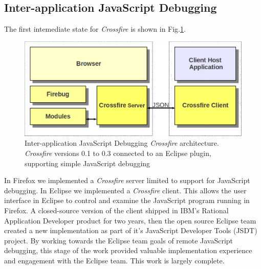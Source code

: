 \subsection{Inter-application JavaScript Debugging}
The first intemediate state for \textit{Crossfire} is shown in Fig.\ref{fig:fireclipse}.
\begin{figure}[htp]
  \includegraphics  [width = 86 mm] {figures/fireclipse.png}
  \caption{Inter-application JavaScript Debugging \textit{Crossfire} architecture.
\textit{Crossfire} versions 0.1 to 0.3 connected to an Eclipse plugin, supporting simple JavaScript debugging}
 \label{fig:fireclipse}
\end{figure}
In Firefox we implemented a \textit{Crossfire} server limited to support for JavaScript debugging.
In Eclipse we implemented a \textit{Crossfire} client. This allows the user interface in Eclipse to control
 and examine the JavaScript program running
in Firefox.  A closed-source version of the client shipped in IBM's Rational Application Developer product for two years,
then the open source Eclipse team created a new implementation as part of it's JavaScript Developer
Tools (JSDT) project\cite{JSDT}.  By working towards the Eclipse team goals of
remote JavaScript debugging, this stage of the work provided valuable implementation 
experience and engagement with the Eclipse team.
This work is largely complete.

